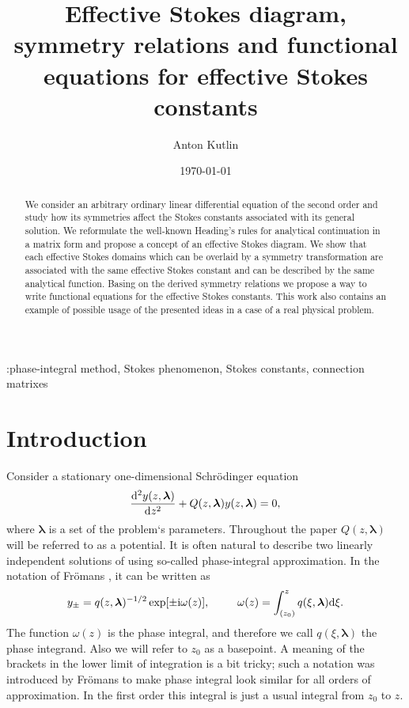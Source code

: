 \documentclass[12pt]{iopart}
\def\lmbd{\bm{\lambda}}
\def\w{\omega}
\newcommand\phsintgrnd[1][z]{q(#1,\lmbd)}
\newcommand\predexp[1][z]{q(#1,\lmbd)^{-1/2}}
\newcommand\phsintgrl[3][z]{\int_{#2}^{#3} \phsintgrnd[#1] \rmd #1}
\begin{document}
\title[Effective Stokes diagram and symmetry relations for effective Stokes constants]{Effective Stokes diagram, symmetry relations and functional equations for effective Stokes constants}
\author{Anton Kutlin}

\address{Institute of Applied Physics of Russian Academy of Sciences, 46 Ulyanov str., 603950 Nizhny Novgorod, Russia}


\date{\today}

\begin{abstract}
We consider an arbitrary ordinary linear differential equation of the second order and study 
how its symmetries affect the Stokes constants associated with its general solution. 
We reformulate the well-known Heading's rules for analytical continuation in a matrix form 
and propose a concept of an effective Stokes diagram. We show that each effective Stokes 
domains which can be overlaid by a symmetry transformation are associated with the same 
effective Stokes constant and can be described by the same analytical function. Basing on
the derived symmetry relations we propose a way to write functional equations for 
the effective Stokes constants. This work also contains an example of possible usage 
of the presented ideas in a case of a real physical problem.
\end{abstract}

\submitto{\jpa}

:phase-integral method, Stokes phenomenon, Stokes constants, connection matrixes


\section{Introduction \label{sec:intro}}
Consider a stationary one-dimensional Schr\"odinger equation
\begin{eqnarray}
\frac{\rmd^2 y(z,\lmbd)}{\rmd z^2} + Q(z,\lmbd)y(z,\lmbd) = 0,   \label{eq:gen}
\end{eqnarray}
where $\lmbd$ is a set of the problem`s parameters. Throughout the paper 
\mbox{$Q(z,\lmbd)$} will be referred to as a potential. It is often natural to describe two 
linearly independent solutions of  using so-called phase-integral 
approximation. In the notation of Fr\"omans \cite{frbook}, it can be written as
\begin{eqnarray}
y_\pm = \predexp \exp [\pm \rmi \w(z)], \qquad \w(z)=\phsintgrl[\xi]{(z_0)}{z}.   \label{eq:phsint}
\end{eqnarray}
The function $\w(z)$ is the phase integral, and therefore we call $\phsintgrnd[\xi]$ 
the phase integrand. Also we will refer to $z_0$ as a basepoint. A meaning of the brackets in the 
lower limit of integration is a bit tricky; such a notation was introduced by Fr\"omans to make
phase integral look similar for all orders of approximation. In the first order this integral is just
a usual integral from $z_0$ to $z$. 
\end{document}

